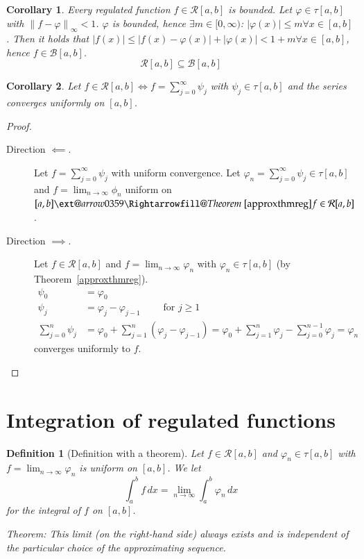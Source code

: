 \documentclass{article}
\makeatletter
\newtheorem{definition}{Definition}  \numberwithin{definition}{section}
\newtheorem*{corollary}{Corollary}%
\newcommand{\norm}[1]{\left\|#1\right\|}
\newcommand{\card}[1]{\left|#1\right|}
\newcommand{\xRightarrow}[2][]{\ext@arrow 0359\Rightarrowfill@{#1}{#2}}
\makeatother
\begin{document}
\begin{corollary}
  Every regulated function $f \in \mathcal R[a,b]$ is bounded.
  Let $\varphi \in \tau[a,b]$ with $\norm{f - \varphi}_{\infty} < 1$.
  $\varphi$ is bounded, hence $\exists m \in [0, \infty)$:
  $\card{\varphi(x)} \leq m \forall x \in [a,b]$.
  Then it holds that $\card{f(x)} \leq \card{f(x) - \varphi(x)} + \card{\varphi(x)} < 1 + m \forall x \in [a,b]$,
  hence $f \in \mathcal B[a,b]$.
  \[ \mathcal R[a,b] \subseteq \mathcal B[a,b] \]
\end{corollary}

\begin{corollary}
  Let $f \in \mathcal R[a,b] \iff f = \sum_{j=0}^\infty \psi_j$ with $\psi_j \in \tau[a,b]$ and the series converges uniformly on $[a,b]$.
\end{corollary}

\begin{proof}\hfill{}
  \begin{description}
    \item[Direction $\impliedby$.]
      Let $f = \sum_{j=0}^\infty \psi_j$ with uniform convergence.
      Let $\varphi_n = \sum_{j=0}^\infty \psi_j \in \tau[a,b]$ and $f = \lim_{n\to\infty} \phi_n$ uniform on $[a,b] \xRightarrow{Theorem~\ref{approxthmreg}} f \in \mathcal R[a,b]$.
    \item[Direction $\implies$.]
      Let $f \in \mathcal R[a,b]$ and $f = \lim_{n\to\infty} \varphi_n$ with $\varphi_n \in \tau[a,b]$ (by Theorem~\ref{approxthmreg}).
      \begin{align*}
        \psi_0 &= \varphi_0 \\
        \psi_j &= \varphi_j - \varphi_{j-1} \qquad \text{ for } j \geq 1 \\
        \sum_{j=0}^n \psi_j &= \varphi_0 + \sum_{j=1}^n (\varphi_j - \varphi_{j-1}) = \varphi_0 + \sum_{j=1}^n \varphi_j - \sum_{j=0}^{n-1} \varphi_j = \varphi_n
      \end{align*}
      converges uniformly to $f$.
  \end{description}
\end{proof}

\section{Integration of regulated functions}

\begin{definition}[Definition with a theorem] %
  Let $f \in \mathcal R[a,b]$ and $\varphi_n \in \tau[a,b]$ with $f = \lim_{n\to\infty} \varphi_n$ is uniform on $[a,b]$.
  We let
  \[ \int_a^b f \, dx = \lim_{n\to\infty} \int_a^b \varphi_n \, dx \]
  for the integral of $f$ on $[a,b]$.

  Theorem: This limit (on the right-hand side) always exists and is independent of the particular choice of the approximating sequence.
\end{definition}
\end{document}
